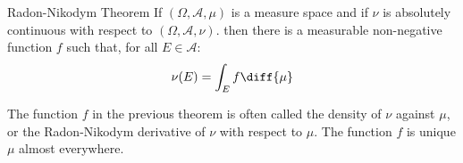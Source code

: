             \begin{ltheorem}{Radon-Nikodym Theorem}
                If $(\Omega,\mathcal{A},\mu)$ is a measure space and if
                $\nu$ is absolutely continuous with respect to
                $(\Omega,\mathcal{A},\nu)$. then there is a measurable
                non-negative function $f$ such that, for all $E\in\mathcal{A}$:
                \begin{equation}
                    \nu(E)=\int_{E}f\diff{\mu}
                \end{equation}
            \end{ltheorem}
            The function $f$ in the previous theorem is often called the
            density of $\nu$ against $\mu$, or the
            Radon-Nikodym derivative of $\nu$ with respect to $\mu$. The
            function $f$ is unique $\mu$ almost everywhere.
